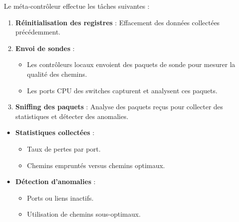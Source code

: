 \documentclass[12pt,a4paper]{report}
\begin{document}
        \begin{card}
            Le m\'eta-contr\^oleur effectue les t\^aches suivantes :
            \begin{card}
            \begin{enumerate}
                \item \textbf{R\'einitialisation des registres} : Effacement des donn\'ees collect\'ees pr\'ec\'edemment.
                \item \textbf{Envoi de sondes} :
                      \begin{itemize}
                          \item Les contr\^oleurs locaux envoient des paquets de sonde pour mesurer la qualit\'e des chemins.
                          \item Les ports CPU des switches capturent et analysent ces paquets.
                      \end{itemize}
                \item \textbf{Sniffing des paquets} : Analyse des paquets re\c cus pour collecter des statistiques et d\'etecter des anomalies.
            \end{enumerate}
            \end{card}
            
            \begin{card}
            \begin{itemize}
                \item \textbf{Statistiques collect\'ees} :
                      \begin{itemize}
                          \item Taux de pertes par port.
                          \item Chemins emprunt\'es versus chemins optimaux.
                      \end{itemize}
                \item \textbf{D\'etection d'anomalies} :
                      \begin{itemize}
                          \item Ports ou liens inactifs.
                          \item Utilisation de chemins sous-optimaux.
                      \end{itemize}
            \end{itemize}
            \end{card}
            

\end{card}
\end{document}
